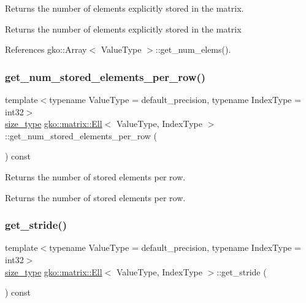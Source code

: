 Returns the number of elements explicitly stored in the matrix. 

\begin{DoxyReturn}{Returns}
the number of elements explicitly stored in the matrix 
\end{DoxyReturn}


References gko\+::\+Array$<$ Value\+Type $>$\+::get\+\_\+num\+\_\+elems().

\mbox{\label{classgko_1_1matrix_1_1Ell_a08f9b04b356e58ab57d03ce335ff11ce}} 
\subsubsection{\texorpdfstring{get\+\_\+num\+\_\+stored\+\_\+elements\+\_\+per\+\_\+row()}{get\_num\_stored\_elements\_per\_row()}}
{\footnotesize\ttfamily template$<$typename Value\+Type = default\+\_\+precision, typename Index\+Type = int32$>$ \\
\hyperlink{namespacegko_a6e5c95df0ae4e47aab2f604a22d98ee7}{size\+\_\+type} \hyperlink{classgko_1_1matrix_1_1Ell}{gko\+::matrix\+::\+Ell}$<$ Value\+Type, Index\+Type $>$\+::get\+\_\+num\+\_\+stored\+\_\+elements\+\_\+per\+\_\+row (\begin{DoxyParamCaption}{ }\end{DoxyParamCaption}) const\hspace{0.3cm}{\ttfamily [noexcept]}}



Returns the number of stored elements per row. 

\begin{DoxyReturn}{Returns}
the number of stored elements per row. 
\end{DoxyReturn}
\mbox{\label{classgko_1_1matrix_1_1Ell_a0be6e75dcea0975b10e3389a9eedacc1}} 
\subsubsection{\texorpdfstring{get\+\_\+stride()}{get\_stride()}}
{\footnotesize\ttfamily template$<$typename Value\+Type = default\+\_\+precision, typename Index\+Type = int32$>$ \\
\hyperlink{namespacegko_a6e5c95df0ae4e47aab2f604a22d98ee7}{size\+\_\+type} \hyperlink{classgko_1_1matrix_1_1Ell}{gko\+::matrix\+::\+Ell}$<$ Value\+Type, Index\+Type $>$\+::get\+\_\+stride (\begin{DoxyParamCaption}{ }\end{DoxyParamCaption}) const\hspace{0.3cm}{\ttfamily [noexcept]}}



